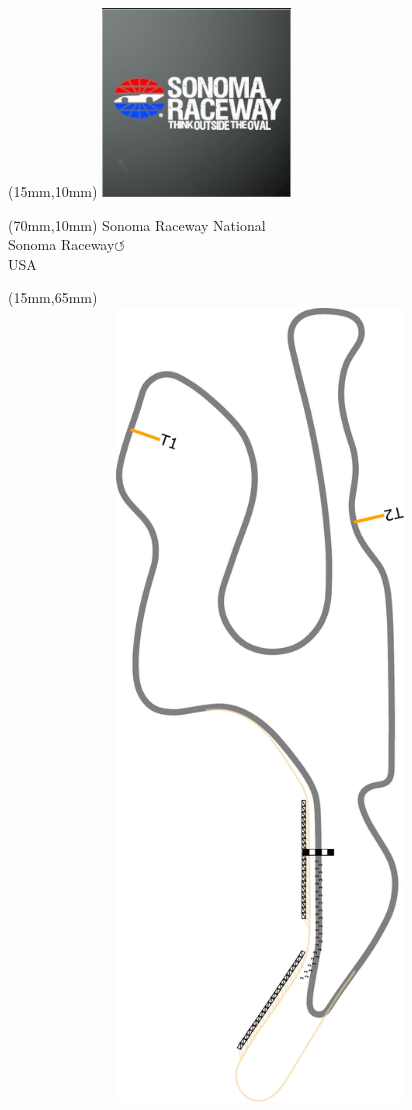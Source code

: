 \null\newpage
\begin{textblock*}{50mm}(15mm,10mm)%
\includegraphics[width=50mm]{LG/2015-05-20_00096.png}
\end{textblock*}
\begin{textblock*}{130mm}(70mm,10mm)%
{\fontsize{20}{20}\selectfont Sonoma Raceway National\\}
{\fontsize{16}{16}\selectfont Sonoma Raceway\hfill \huge$\circlearrowleft$\\}
{\fontsize{12}{12}\selectfont USA\\}
\end{textblock*}
\begin{textblock*}{185mm}(15mm,65mm)%
\centering
\mbox{\includegraphics[width=185mm,height=210mm,keepaspectratio]{PT/SORANA.pdf}}
\end{textblock*}
